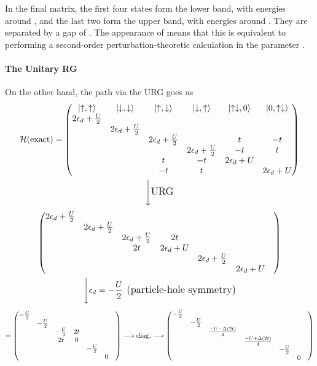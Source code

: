 \documentclass[12pt]{article}
\begin{document}
In the final matrix, the first four states form the lower band, with energies around , and the last two form the upper band, with energies around . They are separated by a gap of . The appearance of  means that this is equivalent to performing a second-order perturbation-theoretic calculation in the parameter .
\paragraph{The Unitary RG}
On the other hand, the path via the URG goes as
\begin{gather*}
	\mathcal{H}(\text{exact}) = \begin{pmatrix}\ket{\uparrow,\uparrow} &\ket{\downarrow,\downarrow} &\ket{\uparrow,\downarrow} & \ket{\downarrow,\uparrow} &\ket{\uparrow\downarrow,0} &\ket{0,\uparrow\downarrow} \\ 
	2\epsilon_d+\frac{U}{2} &&&&& \\
	& 2\epsilon_d+\frac{U}{2} &&&&\\
	&& 2\epsilon_d+\frac{U}{2} && t & -t \\ 
	&&& 2\epsilon_d+\frac{U}{2} & -t & t \\
	&& t & -t & 2\epsilon_d+U & \\
	&& -t & t && 2\epsilon_d+U 
	\end{pmatrix}\\
		\Bigg\downarrow {\large{\text{URG}}}
\end{gather*}
\begin{gather*}
	\begin{pmatrix} 
	2\epsilon_d+\frac{U}{2} &&&&& \\
	& 2\epsilon_d+\frac{U}{2} &&&&\\
	&& 2\epsilon_d+\frac{U}{2} & 2t &&& \\ 
	&& 2t & 2\epsilon_d+U &&& \\
	&&&& 2\epsilon_d+\frac{U}{2} & \\
	&&&&& 2\epsilon_d+U & 
	\end{pmatrix}\\
	\Bigg\downarrow {\large{\epsilon_d = -\ensuremath{\frac{U}{2}}}\text{  (particle-hole symmetry)}}
\end{gather*}
\begin{gather*}
	= \begin{pmatrix} 
	-\frac{U}{2} &&&&& \\
	& -\frac{U}{2} &&&&\\
	&& -\frac{U}{2} & 2t &&& \\ 
	&& 2t & 0 &&& \\
	&&&& -\frac{U}{2} & \\
	&&&&& 0 & 
	\end{pmatrix}
	\longrightarrow\text{diag.}\longrightarrow
	\begin{pmatrix} 
	-\frac{U}{2} &&&&& \\
	& -\frac{U}{2} &&&&\\
	&& \frac{-U-\Delta(2t)}{4} &&&& \\ 
	&&& \frac{-U+\Delta(2t)}{4} &&& \\
	&&&& -\frac{U}{2} & \\
	&&&&& 0 & 
	\end{pmatrix}
\end{gather*}
\end{document}
